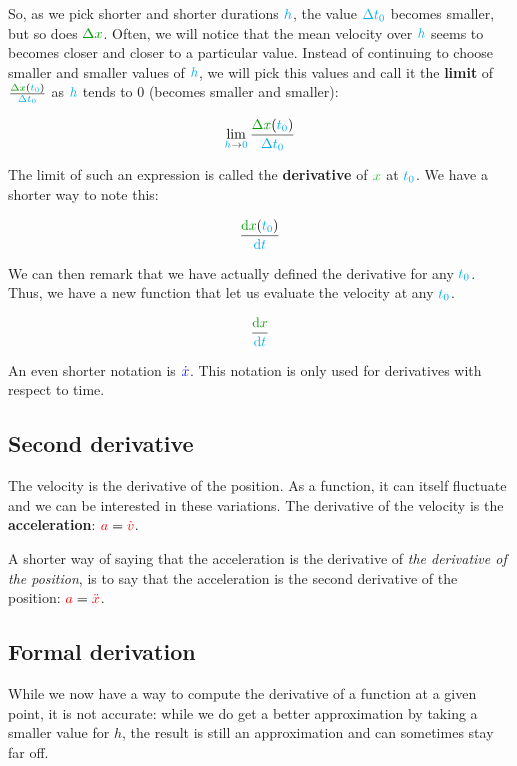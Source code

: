 So, as we pick shorter and shorter durations $\textcolor{cyan}{h}$, the value
$\textcolor{cyan}{\Delta t_0}$ becomes smaller, but so does $\dist{\Delta
x}$. Often, we will notice that the mean velocity over $\textcolor{cyan}{h}$
seems to becomes closer and closer to a particular value. Instead of
continuing to choose smaller and smaller values of $\textcolor{cyan}{h}$, we will
pick this values and call it the \textbf{limit} of $\frac {\dist{\Delta
x}(\delay{t_0})} {\delay{\Delta t_0}}$ as $\textcolor{cyan}{h}$ tends to $0$
(becomes smaller and smaller):

\[
\lim_{\delay{h} \to \delay{0}} \frac {\dist{\Delta x}(\delay{t_0})} {\delay{\Delta t_0}}
\]

The limit of such an expression is called the \textbf{derivative} of
$\posit{x}$ at $\textcolor{cyan}{t_0}$. We have a shorter way to note this:

\[
\frac {\dist{\d x}(\delay{t_0})} {\delay{\dt}}
\]

We can then remark that we have actually defined the derivative for any
$\textcolor{cyan}{t_0}$. Thus, we have a new function that let us evaluate the
velocity at any $\textcolor{cyan}{t_0}$.

\[
\frac {\dist{\d x}} {\delay{\dt}}
\]

\begin{remark}
An even shorter notation is $\textcolor{blue}{\dot x}$. This notation is only used
for derivatives with respect to time.
\end{remark}


\subsection{Second derivative}

The velocity is the derivative of the position. As a function, it can
itself fluctuate and we can be interested in these variations. The
derivative of the velocity is the \textbf{acceleration}: $\textcolor{red}{a} =
\textcolor{red}{\dot v}$.

A shorter way of saying that the acceleration is the derivative of
\textit{the derivative of the position}, is to say that the acceleration
is the second derivative of the position: $\textcolor{red}{a} = \textcolor{red}{\ddot x}$.


\subsection{Formal derivation}

While we now have a way to compute the derivative of a function at a
given point, it is not accurate: while we do get a better approximation
by taking a smaller value for $h$, the result is still an approximation
and can sometimes stay far off.

